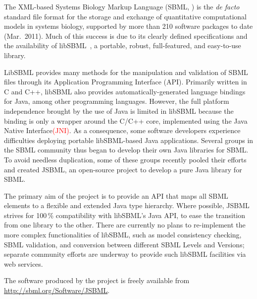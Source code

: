 \documentclass{bioinfo}
\begin{document}
The XML-based Systems Biology Markup Language (SBML, \citealt{M.Hucka03012003})
is the \emph{de facto} standard file format for the storage and exchange of
quantitative computational models in systems biology, supported by more than
210 software packages to date (Mar.~2011).
Much of this success is due to its
clearly defined specifications and the availability of libSBML~\citep{Bornstein2008},
a portable, robust, full-featured, and easy-to-use library.

LibSBML provides many methods for the manipulation and validation of
SBML files through its Application Programming Interface (API).
Primarily written in C and C++, libSBML also provides automatically-generated
language bindings for Java\texttrademark, among other programming languages.
However, the full platform independence brought by the use of Java is limited in
libSBML because the binding is only a wrapper
around the C/C++ core, implemented using the Java Native Interface\textcolor{red}{(JNI)}.
As a consequence, some software developers experience difficulties
deploying portable libSBML-based Java applications.
Several groups in the SBML community thus began to
develop their own Java libraries for SBML. To avoid needless duplication, some of
these groups recently pooled their efforts and created JSBML, an
open-source project to develop a pure Java library for SBML.

The primary aim of the project is to provide an API 
that maps all SBML elements to a flexible and extended
Java type hierarchy. Where possible, JSBML strives for
100\,\% compatibility with libSBML's Java API, to ease the transition from
one library to the other. There are currently no plans to re-implement 
the more complex functionalities of libSBML, such as model consistency checking,
SBML validation, and conversion between different SBML Levels and Versions;
separate community efforts are underway to provide such libSBML facilities
via web services.

The software produced by the project is freely available from
\href{http://sbml.org/Software/JSBML}{http://sbml.org/Software/JSBML}.


\end{document}
